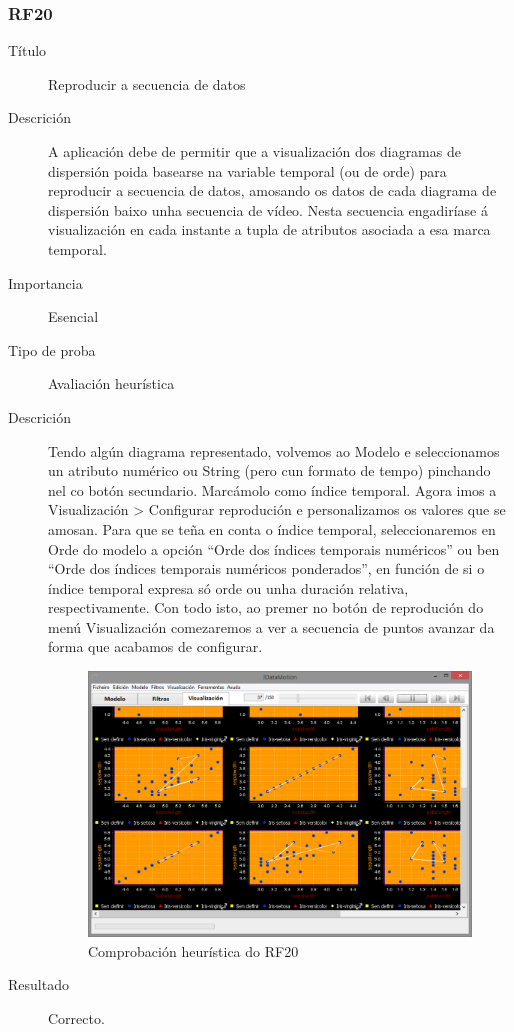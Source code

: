 \subsubsection*{RF20}
\begin{description}
\item[Título] \hfill
Reproducir a secuencia de datos
\item[Descrición] \hfill
A aplicación debe de permitir que a visualización dos diagramas de dispersión poida basearse na variable temporal (ou de orde) para reproducir a secuencia de datos, amosando os datos de cada diagrama de dispersión baixo unha secuencia de vídeo. Nesta secuencia engadiríase á visualización en cada instante a tupla de atributos asociada a esa marca temporal. 
\item[Importancia] \hfill
Esencial
\item[Tipo de proba] \hfill
Avaliación heurística
\item[Descrición]
Tendo algún diagrama representado, volvemos ao Modelo e seleccionamos un atributo numérico ou String (pero cun formato de tempo) pinchando nel co botón secundario. Marcámolo como índice temporal. Agora imos a Visualización \textgreater{} Configurar reprodución e personalizamos os valores que se amosan. Para que se teña en conta o índice temporal, seleccionaremos en Orde do modelo a opción ``Orde dos índices temporais numéricos'' ou ben ``Orde dos índices temporais numéricos ponderados'', en función de si o índice temporal expresa só orde ou unha duración relativa, respectivamente. Con todo isto, ao premer no botón de reprodución do menú Visualización comezaremos a ver a secuencia de puntos avanzar da forma que acabamos de configurar.
\begin{figure}
\centering
\includegraphics[width=\textwidth,height=\textheight,keepaspectratio]{figuras/RF202122}
\caption{Comprobación heurística do RF20}
\label{RF202122}
\end{figure}
\item[Resultado]
Correcto.
\end{description}

